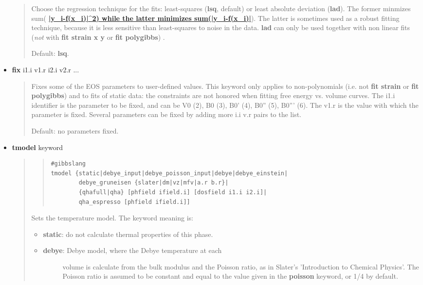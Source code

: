 \documentclass[a4paper]{article}
\begin{document}
\begin{itemize}
\begin{quote}
Choose the regression technique for the fits: least-squares
(\textbf{lsq}, default) or least absolute deviation (\textbf{lad}). The
former minmizes sum(%
\hyperlink{id11}{\textbf{\color{red}|y\_i-f(x\_i)|\textasciicircum{}2) while the latter minimizes
sum(|y\_i-f(x\_i)|}}). The latter is sometimes used as a robust fitting
technique, because it is less sensitive than least-squares to noise
in the data. \textbf{lad} can only be used together with non linear
fits (\emph{not} with \textbf{fit strain x y} or \textbf{fit polygibbs}) .

Default: \textbf{lsq}.

\end{quote}

\item \textbf{fix} i1.i v1.r i2.i v2.r ...
%
\begin{quote}

Fixes some of the EOS parameters to user-defined values. This
keyword only applies to non-polynomials (i.e. not \textbf{fit strain} or
\textbf{fit polygibbs}) and to fits of static data: the constraints are
not honored when fitting free energy vs. volume curves. The i1.i
identifier is the parameter to be fixed, and can be V0 (2), B0 (3),
B0' (4), B0'' (5), B0''' (6). The v1.r is the value with which the
parameter is fixed. Several parameters can be fixed by adding more
i.i v.r pairs to the list.

Default: no parameters fixed.

\end{quote}

\item \textbf{tmodel} keyword
%
\begin{quote}
%
\begin{quote}
\begin{verbatim}
#gibbslang
tmodel {static|debye_input|debye_poisson_input|debye|debye_einstein|
        debye_gruneisen {slater|dm|vz|mfv|a.r b.r}|
        {qhafull|qha} [phfield ifield.i] [dosfield i1.i i2.i]|
        qha_espresso [phfield ifield.i]]
\end{verbatim}
\end{quote}

Sets the temperature model. The keyword meaning is:
%
\begin{itemize}

\item \textbf{static}: do not calculate thermal properties of this phase.

\item %
\begin{description}
\item[{\textbf{debye}: Debye model, where the Debye temperature at each}] \leavevmode 
volume is calculate from the bulk modulus and the Poisson
ratio, as in Slater's 'Introduction to Chemical Physics'. The
Poisson ratio is assumed to be constant and equal to the value
given in the \textbf{poisson} keyword, or 1/4 by default.


\end{description}
\end{itemize}
\end{quote}
\end{itemize}
\end{document}
